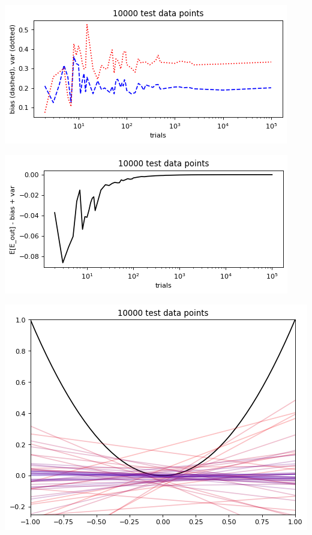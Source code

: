 \documentclass[12pt]{article}
\begin{document}
\pagebreak        
{}
\pagebreak
        \begin{center}\includegraphics[width=0.7\linewidth]{png/10000_data_points_bias-var.png}\end{center}
        \begin{center}\includegraphics[width=0.7\linewidth]{png/10000_data_points_diff.png}\end{center}
        \begin{center}\includegraphics[width=0.68\linewidth]{png/10000_test_data_points.png}\end{center}
\end{document}
